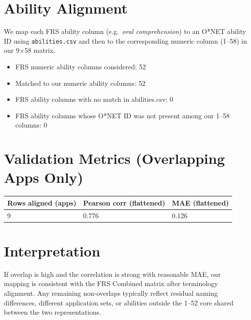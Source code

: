\documentclass[11pt]{article}
\begin{document}
\section*{Ability Alignment}
We map each FRS ability column (e.g.\ \emph{oral comprehension}) to an O*NET ability ID using \texttt{abilities.csv} and then to the corresponding numeric column (1--58) in our 9$\times$58 matrix.

\begin{itemize}
  \item FRS numeric ability columns considered: 52
  \item Matched to our numeric ability columns: 52
  \item FRS ability columns with no match in abilities.csv: 0
  \item FRS ability columns whose O*NET ID was not present among our 1--58 columns: 0
\end{itemize}

\section*{Validation Metrics (Overlapping Apps Only)}
\begin{tabular}{@{}lll@{}}
\toprule
Rows aligned (apps) & Pearson corr (flattened) & MAE (flattened) \\
\midrule
9 & 0.776 & 0.126 \\
\bottomrule
\end{tabular}

\section*{Interpretation}
If overlap is high and the correlation is strong with reasonable MAE, our mapping is consistent with the FRS Combined matrix after terminology alignment. Any remaining non-overlaps typically reflect residual naming differences, different application sets, or abilities outside the 1--52 core shared between the two representations.
\end{document}
